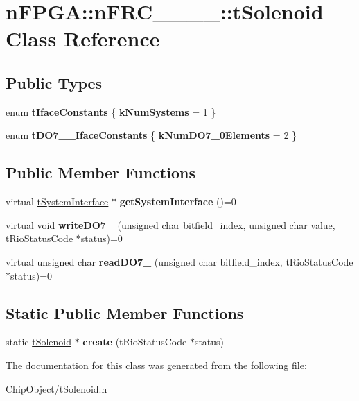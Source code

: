 \hypertarget{classnFPGA_1_1nFRC__2012__1__6__4_1_1tSolenoid}{
\section{nFPGA::nFRC\_\_\_\_::tSolenoid Class Reference}
\label{classnFPGA_1_1nFRC__2012__1__6__4_1_1tSolenoid}
}
\subsection*{Public Types}
\begin{DoxyCompactItemize}
\item 
enum {\bfseries tIfaceConstants} \{ {\bfseries kNumSystems} =  1
 \}
\item 
enum {\bfseries tDO7\_\_\-IfaceConstants} \{ {\bfseries kNumDO7\_\-0Elements} =  2
 \}
\end{DoxyCompactItemize}
\subsection*{Public Member Functions}
\begin{DoxyCompactItemize}
\item 
\hypertarget{classnFPGA_1_1nFRC__2012__1__6__4_1_1tSolenoid_a31580b673fbd2a50dfb1415c3eeca181}{
virtual \hyperlink{classnFPGA_1_1tSystemInterface}{tSystemInterface} $\ast$ {\bfseries getSystemInterface} ()=0}
\label{classnFPGA_1_1nFRC__2012__1__6__4_1_1tSolenoid_a31580b673fbd2a50dfb1415c3eeca181}

\item 
\hypertarget{classnFPGA_1_1nFRC__2012__1__6__4_1_1tSolenoid_a920545638b9d0dcece7d34852146993d}{
virtual void {\bfseries writeDO7\_} (unsigned char bitfield\_\-index, unsigned char value, tRioStatusCode $\ast$status)=0}
\label{classnFPGA_1_1nFRC__2012__1__6__4_1_1tSolenoid_a920545638b9d0dcece7d34852146993d}

\item 
\hypertarget{classnFPGA_1_1nFRC__2012__1__6__4_1_1tSolenoid_a7fedded39e26a3bc5ade0500c8276f64}{
virtual unsigned char {\bfseries readDO7\_} (unsigned char bitfield\_\-index, tRioStatusCode $\ast$status)=0}
\label{classnFPGA_1_1nFRC__2012__1__6__4_1_1tSolenoid_a7fedded39e26a3bc5ade0500c8276f64}

\end{DoxyCompactItemize}
\subsection*{Static Public Member Functions}
\begin{DoxyCompactItemize}
\item 
\hypertarget{classnFPGA_1_1nFRC__2012__1__6__4_1_1tSolenoid_a201d699b9a9ee28c312a897fdd7e2a26}{
static \hyperlink{classnFPGA_1_1nFRC__2012__1__6__4_1_1tSolenoid}{tSolenoid} $\ast$ {\bfseries create} (tRioStatusCode $\ast$status)}
\label{classnFPGA_1_1nFRC__2012__1__6__4_1_1tSolenoid_a201d699b9a9ee28c312a897fdd7e2a26}

\end{DoxyCompactItemize}


The documentation for this class was generated from the following file:\begin{DoxyCompactItemize}
\item 
ChipObject/tSolenoid.h\end{DoxyCompactItemize}
